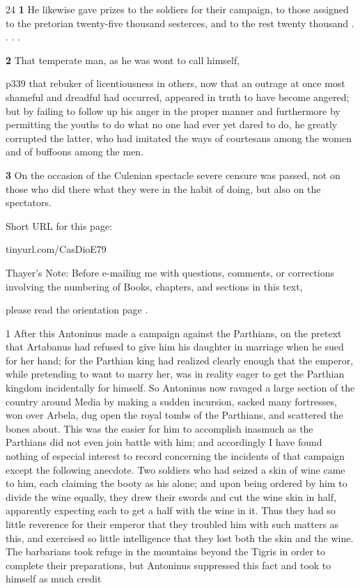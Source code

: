24
\textbf{1} He likewise gave prizes to the soldiers for their campaign, to those assigned to the pretorian twenty-five thousand sesterces, and to the rest twenty thousand . . . .

\textbf{2} That temperate man, as he was wont to call himself,

p339 that rebuker of licentiousness in others, now that an outrage at once most shameful and dreadful had occurred, appeared in truth to have become angered; but by failing to follow up his anger in the proper manner and furthermore by permitting the youths to do what no one had ever yet dared to do, he greatly corrupted the latter, who had imitated the ways of courtesans among the women and of buffoons among the men.

\textbf{3} On the occasion of the Culenian spectacle severe censure was passed, not on those who did there what they were in the habit of doing, but also on the spectators.


Short URL for this page:

tinyurl.com/CasDioE79

Thayer's Note: Before e-mailing me with questions, comments, or corrections involving the numbering of Books, chapters, and sections in this text,

please read the orientation page .

1
After this Antoninus made a campaign against the Parthians, on the pretext that Artabanus had refused to give him his daughter in marriage when he sued for her hand; for the Parthian king had realized clearly enough that the emperor, while pretending to want to marry her, was in reality eager to get the Parthian kingdom incidentally for himself. So Antoninus now ravaged a large section of the country around Media by making a sudden incursion, sacked many fortresses, won over Arbela, dug open the royal tombs of the Parthians, and scattered the bones about. This was the easier for him to accomplish inasmuch as the Parthians did not even join battle with him; and accordingly I have found nothing of especial interest to record concerning the incidents of that campaign except the following anecdote. Two soldiers who had seized a skin of wine came to him, each claiming the booty as his alone; and upon being ordered by him to divide the wine equally, they drew their swords and cut the wine skin in half, apparently expecting each to get a half with the wine in it. Thus they had so little reverence for their emperor that they troubled him with such matters as this, and exercised so little intelligence that they lost both the skin and the wine. The barbarians took refuge in the mountains beyond the Tigris in order to complete their preparations, but Antoninus suppressed this fact and took to himself as much credit

